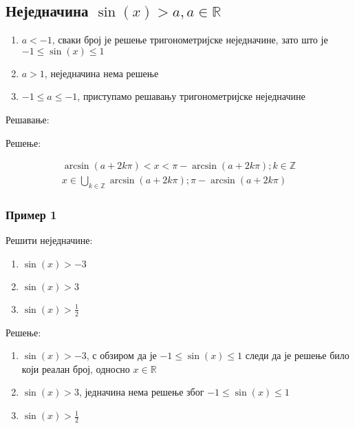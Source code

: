 \documentclass[../diplomski.tex]{subfiles}
\begin{document}
\subsection{Неједначина $\sin(x)>a,a\in\mathbb{R}$}

\begin{enumerate}[label=\alph*)]
\item $a<-1$, сваки број је решење тригонометријске неједначине, зато што је $-1\leq\sin(x)\leq1$
\item $a>1$, неједначина нема решење
\item $-1\leq a\leq-1$, приступамо решавању тригонометријске неједначине
\end{enumerate}

Решавање:



Решење:

\begin{equation}
\begin{split}
\arcsin(a+2k\pi)<x<\pi-\arcsin(a+2k\pi);k\in\mathbb{Z}\\
x\in\bigcup\limits_{k\in\mathbb{Z}}\arcsin(a+2k\pi);\pi-\arcsin(a+2k\pi)	
\end{split}
\end{equation}


\subsubsection{Пример 1}

Решити неједначине:

\begin{enumerate}[label=\alph*)]
\item $\sin(x)>-3$
\item $\sin(x)>3$
\item $\sin(x)>\frac{1}{2}$
\end{enumerate}

Решење:

\begin{enumerate}[label=\alph*)]
\item $\sin(x)>-3$, с обзиром да је $-1\le\sin(x)\le1$ следи да је решење било који реалан број, односно  $x\in\mathbb{R}$
\item $\sin(x)>3$, једначина нема решење због $-1\le\sin(x)\le1$
\item $\sin(x)>\frac{1}{2}$
\end{enumerate}
\end{document}
